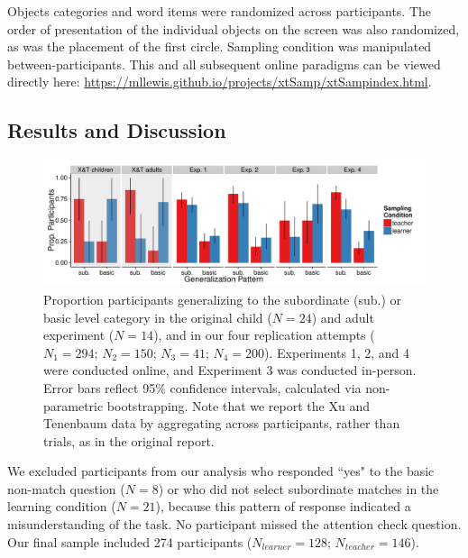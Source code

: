 \documentclass[man]{apa2}
\begin{document}
Objects categories and word items were randomized across participants. The order of presentation of the individual objects on the screen was also randomized, as was the placement of the first circle. Sampling condition was manipulated between-participants.  This and all subsequent online paradigms can be viewed directly here: \url{https://mllewis.github.io/projects/xtSamp/xtSampindex.html}.

\subsection{Results and Discussion}
 \begin{figure} [t]
 \begin{center} 
  \includegraphics[width=6.5in]{figures/FIG_2.pdf} 
  \caption{\label{fig:bar_plots} Proportion participants generalizing to the subordinate (sub.) or basic level category in the original child ($N = 24$) and adult experiment ($N = 14$), and in our four replication attempts ($N_{1} = 294$; $N_{2} = 150$; $N_{3}  = 41$; $N_{4}  = 200$).  Experiments 1, 2, and 4 were conducted online, and Experiment 3 was conducted in-person. Error bars reflect 95\% confidence intervals, calculated via non-parametric bootstrapping. Note that we report the Xu and Tenenbaum data by aggregating across participants, rather than trials, as in the original report.} 
 \end{center} 
\end{figure}

We excluded participants from our analysis who responded ``yes" to the basic non-match question ($N=8$) or who did not select subordinate matches in the learning condition ($N = 21$), because this pattern of response indicated a misunderstanding of the task. No participant missed the attention check question. Our final sample  included 274 participants ($N_{learner} = 128$; $N_{teacher} = 146$).
\end{document}
